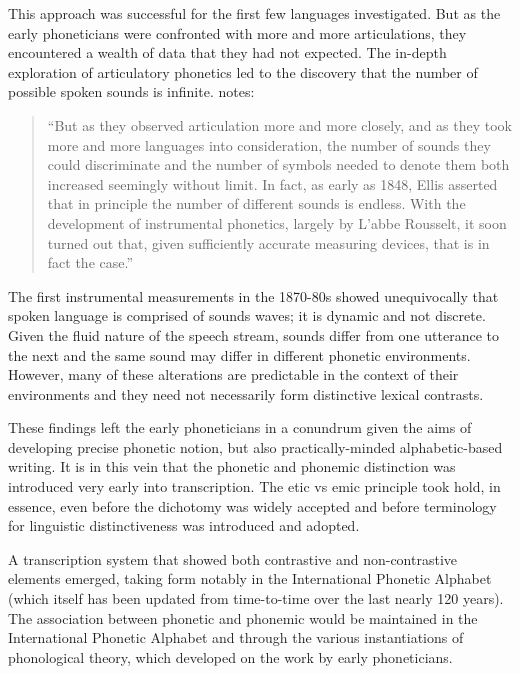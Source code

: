 This approach was successful for the first few languages investigated. But as the early phoneticians were confronted with more and more articulations, they encountered a wealth of data that they had not expected. The in-depth exploration of articulatory phonetics led to the discovery that the number of possible spoken sounds is infinite. \cite{Hockett1995} notes:

\begin{quote}
``But as they observed articulation more and more closely, and as they took more and more languages into consideration, the number of sounds they could discriminate and the number of symbols needed to denote them both increased seemingly without limit. In fact, as early as 1848, Ellis asserted that in principle the number of different sounds is endless. With the development of instrumental phonetics, largely by L'abbe Rousselt, it soon turned out that, given sufficiently accurate measuring devices, that is in fact the case.''
\end{quote}



The first instrumental measurements in the 1870-80s showed unequivocally that spoken language is comprised of sounds waves; it is dynamic and not discrete. Given the fluid nature of the speech stream, sounds differ from one utterance to the next and the same sound may differ in different phonetic environments. However, many of these alterations are predictable in the context of their environments and they need not necessarily form distinctive lexical contrasts.

These findings left the early phoneticians in a conundrum given the aims of developing precise phonetic notion, but also practically-minded alphabetic-based writing. It is in this vein that the phonetic and phonemic distinction was introduced very early into transcription. The etic vs emic principle took hold, in essence, even before the dichotomy was widely accepted and before terminology for linguistic distinctiveness was introduced and adopted.

A transcription system that showed both contrastive and non-contrastive elements emerged, taking form notably in the International Phonetic Alphabet (which itself has been updated from time-to-time over the last nearly 120 years). The association between phonetic and phonemic would be maintained in the International Phonetic Alphabet and through the various instantiations of phonological theory, which developed on the work by early phoneticians.

